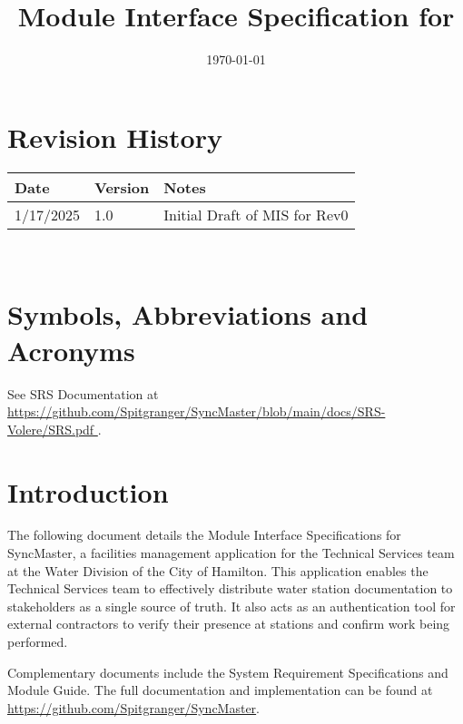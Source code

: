 \documentclass[12pt, titlepage]{article}
\begin{document}
\title{Module Interface Specification for \progname{}}

\author{\authname}

\date{\today}

\maketitle


\section{Revision History}

\begin{tabularx}{\textwidth}{p{3cm}p{2cm}X}
  \toprule {\bf Date} & {\bf Version} & {\bf Notes}\\
  \midrule
  1/17/2025 & 1.0 & Initial Draft of MIS for Rev0\\
  \bottomrule
\end{tabularx}

~\newpage

\section{Symbols, Abbreviations and Acronyms}

See SRS Documentation at
\url{https://github.com/Spitgranger/SyncMaster/blob/main/docs/SRS-Volere/SRS.pdf
}.

\newpage

\tableofcontents

\newpage


\section{Introduction}

The following document details the Module Interface Specifications for
SyncMaster, a facilities management application for the Technical
Services team at the Water Division of the City of Hamilton.
This application enables the Technical Services team to effectively distribute
water station documentation to stakeholders as a single source of
truth. It also acts as an authentication tool for external
contractors to verify their presence at stations and confirm work
being performed.

Complementary documents include the System Requirement Specifications
and Module Guide.  The full documentation and implementation can be
found at \url{https://github.com/Spitgranger/SyncMaster}.
\end{document}
